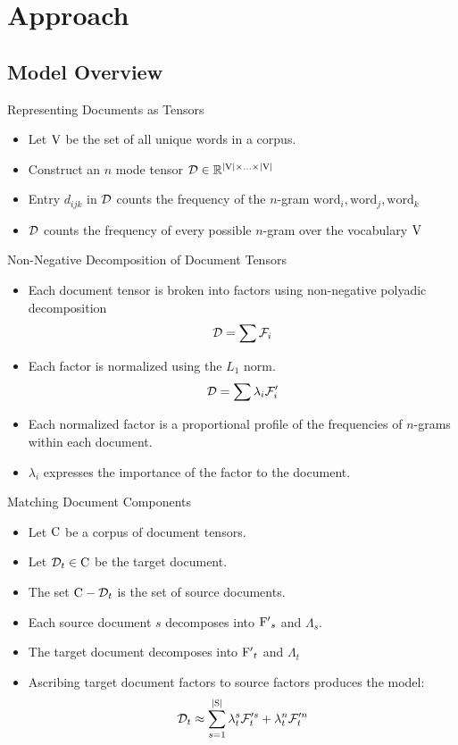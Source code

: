 \documentclass[handout]{beamer}
\begin{document}
\section{Approach}
\subsection{Model Overview}
\begin{frame}{Representing Documents as Tensors}
  \begin{itemize}[<+->]
  \item Let $\mathrm{V}$ be the set of all unique words in a corpus.
  \item Construct an $n$ mode tensor $\mathcal{D} \in \mathbb{R}^{|\mathrm{V}|
      \times \ldots \times |\mathrm{V}|}$
  \item Entry $d_{ijk}$ in $\mathcal{D}$ counts the frequency of the $n$-gram
    $\mathrm{word}_i, \mathrm{word}_j, \mathrm{word}_k$
  \item $\mathcal{D}$ counts the frequency of every possible $n$-gram
    over the vocabulary $\mathrm{V}$
  \end{itemize}
\end{frame}



\begin{frame}{Non-Negative Decomposition of Document Tensors}
  \begin{itemize}[<+->]
    \item Each document tensor is broken into factors using non-negative polyadic
      decomposition
      \[
          \mathcal{D} = \sum \mathcal{F}_i 
        \]
      \item Each factor is normalized using the $L_1$ norm.
        \[
          \mathcal{D} = \sum \lambda_i \mathcal{F}'_i
        \]
      \item Each normalized factor is a proportional profile of the
        frequencies of $n$-grams within each document.
      \item $\lambda_i$ expresses the importance of the factor to the
        document.
  \end{itemize}
\end{frame}


\begin{frame}{Matching Document Components}
  \begin{itemize}[<+->]
  \item Let $\mathrm{C}$ be a corpus of document tensors.
  \item Let $\mathcal{D}_t \in \mathrm{C}$ be the target document.
  \item The set $\mathrm{C}-\mathcal{D}_t$ is the set of source documents.
  \item Each source document $s$ decomposes into $\mathrm{F'}_s$  and
    $\Lambda_s$.
  \item The target document decomposes into $\mathrm{F'}_t$ and
    $\Lambda_t$
  \item Ascribing target document factors to source factors produces
    the model:
    \[
      \mathcal{D}_t \approx \sum_{s=1}^{|\mathrm{S}|} \lambda^s_t \mathcal{F}'^s_t +
  \lambda^n_t \mathcal{F}'^n_t
    \]
  \end{itemize}
\end{frame}
\end{document}
